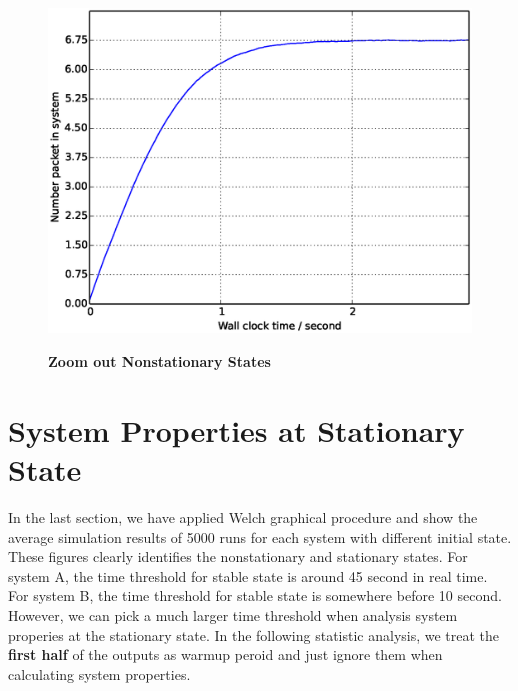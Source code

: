 \documentclass[12pt]{article}  %
\theoremstyle{definition}
\theoremstyle{remark}
\begin{document}
\begin{figure}
{        \includegraphics[scale=0.4]{Lmda10Init0OflAvg5000.eps}
        \label{fig:systemB:init0:warmup}
}
\hfill
{}
\caption{\textbf{Zoom out Nonstationary States}}
\end{figure}


\section{System Properties at Stationary State}
In the last section, we have applied Welch graphical procedure and show the average simulation results of 5000 runs for each system with different initial state.
These figures clearly identifies the nonstationary and stationary states.
For system A, the time threshold for stable state is around 45 second in real time.
For system B, the time threshold for stable state is somewhere before 10 second.
However, we can pick a much larger time threshold when analysis system properies at the stationary state.
In the following statistic analysis, we treat the \textbf{first half} of the outputs as warmup peroid and just ignore them when calculating system properties.
\end{document}
